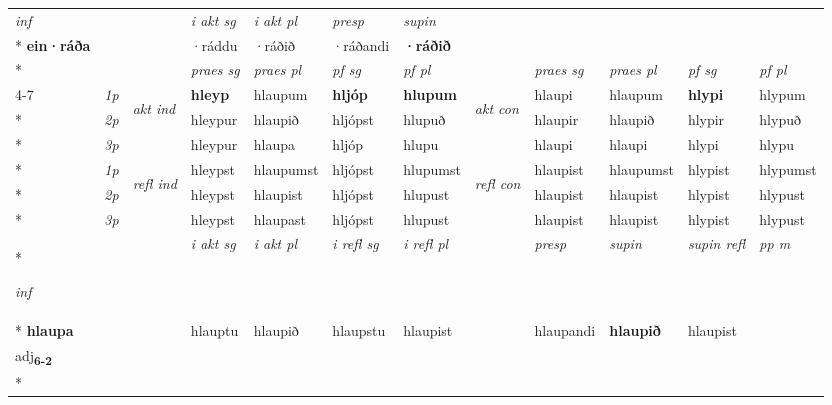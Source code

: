 \begin{longtable}[l]{X>{\footnotesize\itshape}llXXXXlXXXX}
   {\textit{inf}} & &  & \textit{i akt sg} & \textit{i akt pl}   & \textit{presp} & \textit{supin}   \\*
  {\textbf{ein\allowbreak ·ráða}} & && ·ráddu  & ·ráðið   & ·ráðandi &  \textbf{·ráðið}   \\*

\midrule

 & &   & \textit{praes sg}  & \textit{praes pl}    & \textit{ pf sg} & \textit{pf pl} & & \textit{praes sg}  & \textit{praes pl}    & \textit{pf sg} & \textit{pf pl }  \\ \cmidrule{4-7} \cmidrule{9-12}
 \multirow{2}{*}{{{\textbf{v{\textsubscript{6}}} \Large{\textbf{90}}}}}  & 1p & \multirow{3}{*}{\begin{turn}{90}\textit{akt ind}\end{turn}} & \textbf{hleyp} & hlaupum & \textbf{hljóp} & \textbf{hlupum} & \multirow{3}{*}{\begin{turn}{90}\textit{akt con}\end{turn}} &hlaupi & hlaupum & \textbf{hlypi} & hlypum\\*
 & 2p &  &  hleypur  & hlaupið & hljópst & hlupuð & & hlaupir & hlaupið & hlypir & hlypuð \\*
 & 3p &  & hleypur & hlaupa & hljóp & hlupu & & hlaupi & hlaupi& hlypi & hlypu \\*
\cmidrule{4-7} \cmidrule{9-12}
 & 1p & \multirow{3}{*}{\begin{turn}{90}\textit{refl ind}\end{turn}}  & hleypst & hlaupumst & hljópst & hlupumst & \multirow{3}{*}{\begin{turn}{90}\textit{refl con}\end{turn}}  &hlaupist & hlaupumst & hlypist & hlypumst \\*
 & 2p &  & hleypst & hlaupist & hljópst & hlupust & &hlaupist & hlaupist & hlypist & hlypust \\*
 & 3p  & & hleypst & hlaupast & hljópst & hlupust & & hlaupist & hlaupist& hlypist & hlypust \\*
\cmidrule{4-7} \cmidrule{9-12}

   {\textit{inf}} & &  & \textit{i akt sg} & \textit{i akt pl} & \textit{i refl sg} & \textit{i refl pl} && \textit{presp} & \textit{supin} & \textit{supin refl} & \textit{pp m} \\*
  {\textbf{hlaupa}} & && hlauptu  & hlaupið & hlaupstu & hlaupist && hlaupandi &  \textbf{hlaupið} & hlaupist & \specialcell{\textbf{hlaupinn} \\ adj\textbf{\textsubscript{6-2}}} \\*


\end{longtable}
